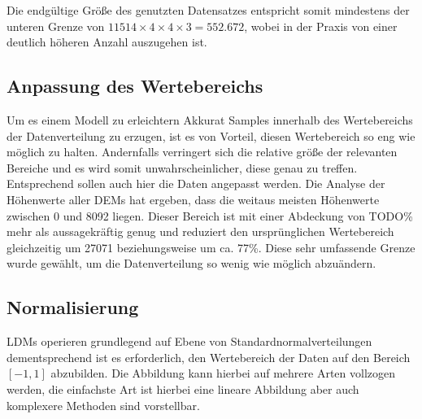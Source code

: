 Die endgültige Größe des genutzten Datensatzes entspricht somit mindestens der unteren Grenze von $11514\times4\times4\times3 = 552.672$, wobei in der Praxis von einer deutlich höheren Anzahl auszugehen ist.


\subsection{Anpassung des Wertebereichs}

Um es einem Modell zu erleichtern Akkurat Samples innerhalb des Wertebereichs der Datenverteilung zu erzugen, ist es von Vorteil, diesen Wertebereich so eng wie möglich zu halten. Andernfalls verringert sich die relative größe der relevanten Bereiche und es wird somit unwahrscheinlicher, diese genau zu treffen. Entsprechend sollen auch hier die Daten angepasst werden. 
Die Analyse der Höhenwerte aller DEMs hat ergeben, dass die weitaus meisten Höhenwerte zwischen 0 und 8092 liegen. Dieser Bereich ist mit einer Abdeckung von TODO\% mehr als aussagekräftig genug und reduziert den ursprünglichen Wertebereich gleichzeitig um 27071 beziehungsweise um ca. 77\%. 
Diese sehr umfassende Grenze wurde gewählt, um die Datenverteilung so wenig wie möglich abzuändern. 

\subsection{Normalisierung}

LDMs operieren grundlegend auf Ebene von Standardnormalverteilungen dementsprechend ist es erforderlich, den Wertebereich der Daten auf den Bereich $\left [ -1, 1\right ]$ abzubilden. Die Abbildung kann hierbei auf mehrere Arten vollzogen werden, die einfachste Art ist hierbei eine lineare Abbildung aber auch komplexere Methoden sind vorstellbar. 


